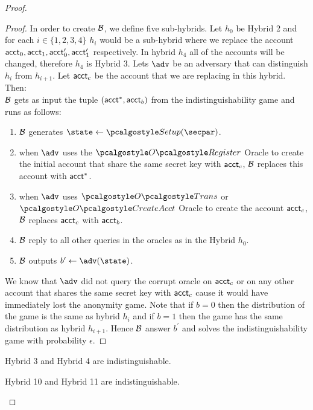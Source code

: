 \begin{proof}
\begin{proof}
    In order to create $\mathcal{B}$, we define five sub-hybrids. Let $h_0$ be Hybrid 2 and for each $i \in \{1,2,3,4\}$ $h_i$ would be a sub-hybrid where we replace the account $\textup{\textsf{acct}}_0, \textup{\textsf{acct}}_1, \textup{\textsf{acct}}_0^\prime, \textup{\textsf{acct}}_1^\prime$ respectively. In hybrid $h_4$ all of the accounts will be changed, therefore $h_4$ is Hybrid 3. Lets $\adv$ be an adversary that can distinguish  $h_i$ from $h_{i+1}$. Let $\textup{\textsf{acct}}_c$ be the account that we are replacing in this hybrid. Then: \\
    $\mathcal{B}$ gets as input the tuple $(\textup{\textsf{acct}}^*, \textup{\textsf{acct}}_b)$ from the indistinguishability game and runs as follows:
    \begin{enumerate}
        \item $\mathcal{B}$ generates $\state \gets \setup(\secpar)$.
        \item when $\adv$ uses the $\regOracle$ Oracle to create the initial account that share the same secret key with $\textup{\textsf{acct}}_c$, $\mathcal{B}$ replaces this account with $\textup{\textsf{acct}}^*$.
        \item when $\adv$ uses $\transOracle$  or $\createAcctOracle$ Oracle to create the account $\textup{\textsf{acct}}_c$, $\mathcal{B}$ replaces $\textup{\textsf{acct}}_c$ with $\textup{\textsf{acct}}_b$.
        \item $\mathcal{B}$ reply to all other queries in the oracles as in the Hybrid $h_0$.
        \item $\mathcal{B}$ outputs $b^\prime \gets \adv(\state)$.  
    \end{enumerate}
    We know that $\adv$ did not query the corrupt oracle on $\textup{\textsf{acct}}_c$ or on any other account that shares the same secret key with $\textup{\textsf{acct}}_c$ cause it would have immediately lost the anonymity game. Note that if $b=0$ then the distribution of the game is the same as hybrid $h_i$ and if $b = 1$ then the game has the same distribution as hybrid $h_{i+1}$. Hence $\mathcal{B}$ answer $b^\prime$ and solves the indistinguishability game with probability $\epsilon$.
\end{proof}

\begin{lemma}
    Hybrid 3 and Hybrid 4 are indistinguishable.
\end{lemma}
\begin{corollary}
    Hybrid 10 and Hybrid 11 are indistinguishable.
\end{corollary}


\end{proof}
